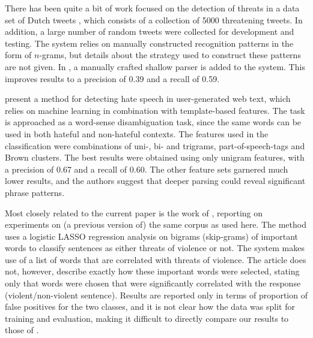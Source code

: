 \documentclass[11pt,letterpaper]{article}
\newcommand{\tovs}{threats of violence}
\begin{document}
There has been quite a bit of work focused on the detection of threats in a data set of Dutch tweets \cite{nellngram2013,nellshallow2013}, which consists of a collection of 5000 threatening tweets. %
In addition, a large number of random tweets were collected for development and testing. %
The system relies on manually constructed recognition patterns in the form of $n$-grams, 
but details about the strategy used to construct these patterns are not given. %
In , a manually crafted shallow parser is added to the system. This improves results to a precision of 0.39 and a recall of 0.59.

 present a method for detecting hate speech in user-generated web text, which relies on machine learning in combination with template-based features. The task is approached as a word-sense disambiguation task, since the same words can be used in both hateful and non-hateful contexts. The features used in the classification were combinations of uni-, bi- and trigrams, part-of-speech-tags and Brown clusters.  The best results were obtained using only unigram features, with a precision of 0.67 and a recall of 0.60. The other feature sets garnered much lower results, and the authors suggest that deeper parsing could reveal significant phrase patterns.

Most closely related to the current paper is the work of , reporting on experiments on (a previous version of) the same corpus as used here. The method uses a logistic LASSO regression analysis on bigrams (skip-grams) of important words to classify sentences as either \tovs{} or not.  The system makes use of a list of words that are correlated with threats of violence. The article does not, however, describe exactly how these important words were selected, stating only that words were chosen that were significantly correlated with the response (violent/non-violent sentence). Results are reported only in terms of proportion of false positives for the two classes, and it is not clear how the data was split for training and evaluation, making it difficult to directly compare our results to those of .
\end{document}
